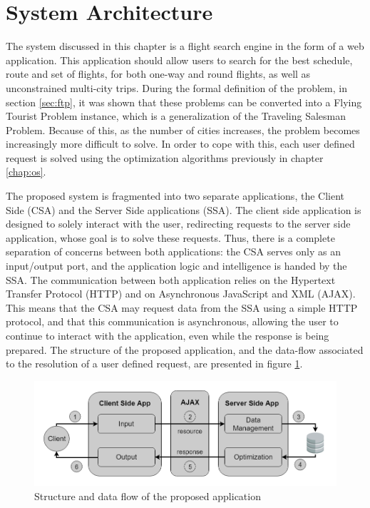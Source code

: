 \section{System Architecture}
\label{sec:system_architecture}

The system discussed in this chapter is a flight search engine in the form of a web application. This application should allow users to search for the best schedule, route and set of flights, for both one-way and round flights, as well as unconstrained multi-city trips. During the formal definition of the problem, in section \ref{sec:ftp}, it was shown that these problems can be converted into a Flying Tourist Problem instance, which is a generalization of the Traveling Salesman Problem. Because of this, as the number of cities increases, the problem becomes increasingly more difficult to solve. In order to cope with this, each user defined request is solved using the optimization algorithms previously  in chapter \ref{chap:os}.

The proposed system is fragmented into two separate applications, the Client Side (CSA) and the Server Side applications (SSA). The client side application is designed to solely interact with the user, redirecting  requests to the server side application, whose goal is to solve these requests. Thus, there is a complete separation of concerns between both applications: the CSA serves only as an input/output port, and the application logic and intelligence is handed by the SSA. The communication between both application relies on the Hypertext Transfer Protocol (HTTP) and on Asynchronous JavaScript and XML (AJAX). This means that the CSA may request data from the SSA using a simple HTTP protocol, and that this communication is asynchronous, allowing the user to continue to interact with the application, even while the response is being prepared. The structure of the proposed application, and the data-flow associated to the resolution of a user defined request, are presented in figure \ref{fig:sa_design}.

\begin{figure}[htpb]
  \centering
  \includegraphics[width=\textwidth]{./Figures/system_design/system_architecture_design.png}
	\caption{Structure and data flow of the proposed application}
  \label{fig:sa_design}  
\end{figure}

